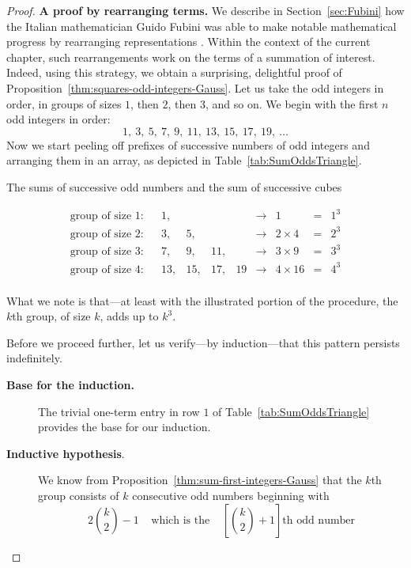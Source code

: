 \begin{proof}
{\bf A proof by rearranging terms.}
%
We describe in Section~\ref{sec:Fubini} how the Italian mathematician
Guido Fubini
%
was able to make notable mathematical progress by rearranging
representations \cite{Fubini}.  Within the context of the current
chapter, such rearrangements work on the terms of a summation of
interest.  Indeed, using this strategy, we obtain a surprising,
delightful proof of Proposition~\ref{thm:squares-odd-integers-Gauss}.
Let us take the odd integers in order, in groups of sizes $1$, then
$2$, then $3$, and so on.  We begin with the first $n$ odd integers in
order:
\[ 1, \ 3, \ 5, \ 7, \ 9, \ 11, \ 13, \ 15, \ 17, \ 19, \ \ldots \]
Now we start peeling off prefixes of successive numbers of odd
integers and arranging them in an array, as depicted in
Table~\ref{tab:SumOddsTriangle}.
\begin{table}[h]
\label{tab:SumOddsTriangle}
\caption{The sums of successive odd numbers and the sum of
  successive cubes}
\[
\begin{array}{llrrrrclcc}
\mbox{group of size 1:} & &
1,  &    &     &     &  \rightarrow & 1           & = & 1^3 \\
\mbox{group of size 2:} & &
3,  &  5, &     &    &  \rightarrow & 2 \times 4  & = & 2^3 \\
\mbox{group of size 3:} & &
7,  &  9, & 11, &    &  \rightarrow & 3 \times 9  & = & 3^3 \\
\mbox{group of size 4:} & &
13, & 15, & 17, & 19 &  \rightarrow & 4 \times 16 & = & 4^3 \\
\end{array}
\]
\end{table}
What we note is that---at least with the illustrated portion of the
procedure, the $k$th group, of size $k$, adds up to $k^3$.

Before we proceed further, let us verify---by induction---that this
pattern persists indefinitely.
\begin{description}
\item[{\bf Base for the induction.}]
The trivial one-term entry in row $1$ of Table~\ref{tab:SumOddsTriangle}
provides the base for our induction.

\item[{\bf Inductive hypothesis}.]
We know from Proposition~\ref{thm:sum-first-integers-Gauss} that the
$k$th group consists of $k$ consecutive odd numbers beginning with
\[ 2 {k \choose 2} -1 \ \ \ \ \
\mbox{which is the} \ \ \ \ \
\left[ {k \choose 2} +1 \right]\mbox{th odd number}
\]


\end{description}
\end{proof}
